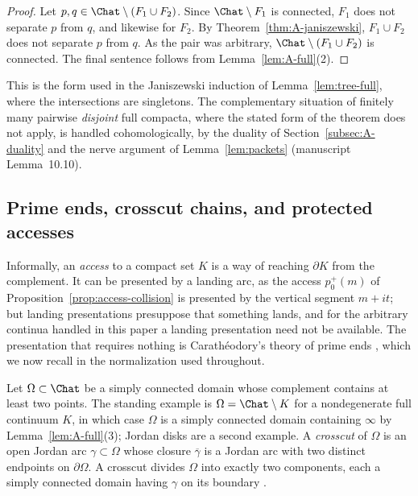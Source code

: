 \begin{proof}
Let $p,q\in\Chat\setminus(F_1\cup F_2)$.  Since $\Chat\setminus F_1$ is
connected, $F_1$ does not separate $p$ from $q$, and likewise for $F_2$.
By Theorem~\ref{thm:A-janiszewski}, $F_1\cup F_2$ does not separate $p$
from $q$.  As the pair was arbitrary, $\Chat\setminus(F_1\cup F_2)$ is
connected.  The final sentence follows from Lemma~\ref{lem:A-full}(2).
\end{proof}

This is the form used in the Janiszewski induction of
Lemma~\ref{lem:tree-full}, where the intersections are singletons.  The
complementary situation of finitely many pairwise \emph{disjoint} full
compacta, where the stated form of the theorem does not apply, is handled
cohomologically, by the duality of Section~\ref{subsec:A-duality} and the
nerve argument of Lemma~\ref{lem:packets} (manuscript Lemma~10.10).

\subsection{Prime ends, crosscut chains, and protected accesses}
\label{subsec:A-primeends}

Informally, an \emph{access} to a compact set $K$ is a way of reaching
$\partial K$ from the complement.  It can be presented by a landing arc,
as the access $p_0^{+}(m)$ of Proposition~\ref{prop:access-collision} is
presented by the vertical segment $m+it$; but landing presentations
presuppose that something lands, and for the arbitrary continua handled in
this paper a landing presentation need not be available.  The presentation that requires
nothing is Carath\'eodory's theory of prime ends \cite{Pom92}, which we
now recall in the normalization used throughout.

Let $\Omega\subset\Chat$ be a simply connected domain whose complement
contains at least two points.  The standing example is
$\Omega=\Chat\setminus K$ for a nondegenerate full continuum $K$, in which
case $\Omega$ is a simply connected domain containing $\infty$ by
Lemma~\ref{lem:A-full}(3); Jordan disks are a second example.  A
\emph{crosscut} of $\Omega$ is an open Jordan arc $\gamma\subset\Omega$
whose closure $\overline{\gamma}$ is a Jordan arc with two distinct
endpoints on $\partial\Omega$.  A crosscut divides $\Omega$ into exactly
two components, each a simply connected domain having $\gamma$ on its
boundary \cite{Pom92}.

